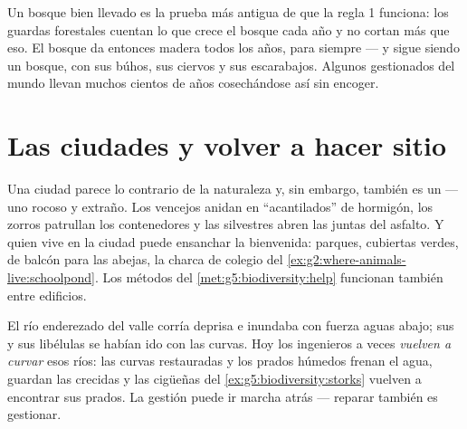 \begin{example}\label{ex:g5:people-and-nature:forester}
Un bosque bien llevado es la prueba más antigua de que la regla 1
funciona: los guardas forestales cuentan lo que crece el bosque cada
año y no cortan más que eso. El bosque da entonces madera todos los
años, para siempre --- y sigue siendo un bosque, con sus búhos, sus
ciervos y sus escarabajos. Algunos  gestionados del mundo llevan
muchos cientos de años cosechándose así sin encoger.
\end{example}

\section{Las ciudades y volver a hacer sitio}

\begin{example}\label{ex:g5:people-and-nature:city}
Una ciudad parece lo contrario de la naturaleza y, sin embargo,
también es un  --- uno rocoso y extraño. Los vencejos anidan en
``acantilados'' de hormigón, los zorros patrullan los contenedores y
las  silvestres abren las juntas del asfalto. Y quien vive en
la ciudad puede ensanchar la bienvenida: parques, cubiertas verdes,
 de balcón para las abejas, la charca de colegio del
\cref{ex:g2:where-animals-live:schoolpond}. Los métodos del
\cref{met:g5:biodiversity:help} funcionan también entre edificios.
\end{example}

\begin{example}\label{ex:g5:people-and-nature:river}
El río enderezado del valle corría deprisa e inundaba con fuerza aguas
abajo; sus  y sus libélulas se habían ido con las curvas. Hoy los
ingenieros a veces \emph{vuelven a curvar} esos ríos: las curvas
restauradas y los prados húmedos frenan el agua, guardan las crecidas
y las cigüeñas del \cref{ex:g5:biodiversity:storks} vuelven a
encontrar sus prados. La gestión puede ir marcha atrás --- reparar
también es gestionar.
\end{example}

